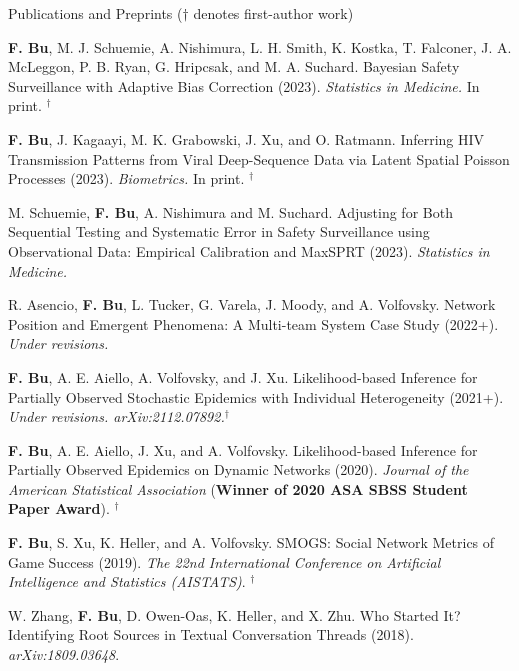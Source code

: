 \documentclass{resume} %
\begin{document}
\begin{rSection}{Publications and Preprints}
{\footnotesize{($\dagger$ denotes first-author work)}}

\textbf{F. Bu}, M. J. Schuemie,  A. Nishimura, L. H. Smith, K. Kostka, T. Falconer, J. A. McLeggon, P. B. Ryan, G. Hripcsak, and M. A. Suchard.
Bayesian Safety Surveillance with Adaptive Bias Correction (2023). \emph{Statistics in Medicine.}  In print.  $^\dagger$

\smallskip

\textbf{F. Bu}, J. Kagaayi, M. K. Grabowski, J. Xu, and O. Ratmann.
Inferring HIV Transmission Patterns from Viral Deep-Sequence Data via Latent Spatial Poisson Processes (2023). \emph{Biometrics.} In print. $^\dagger$

\smallskip

M. Schuemie, \textbf{F. Bu}, A. Nishimura and M. Suchard.
Adjusting for Both Sequential Testing and Systematic Error in Safety Surveillance using Observational Data: Empirical Calibration and MaxSPRT (2023). \emph{Statistics in Medicine.}

\smallskip

R. Asencio, \textbf{F. Bu}, L. Tucker, G. Varela, J. Moody, and A. Volfovsky. 
Network Position and Emergent Phenomena: A Multi-team System Case Study (2022+). \emph{Under revisions.}

\smallskip

\textbf{F. Bu}, A. E. Aiello, A. Volfovsky, and J. Xu.  
Likelihood-based Inference for Partially Observed Stochastic Epidemics with Individual Heterogeneity (2021+). \emph{Under revisions.  arXiv:2112.07892.}$^\dagger$

\smallskip


\textbf{F. Bu}, A. E. Aiello, J. Xu, and A. Volfovsky. 
Likelihood-based Inference for Partially Observed Epidemics on Dynamic Networks (2020). \emph{Journal of the American Statistical Association} (\textbf{Winner of 2020 ASA SBSS Student Paper Award}). $^\dagger$

\smallskip

\textbf{F. Bu}, S. Xu, K. Heller, and A. Volfovsky. 
SMOGS: Social Network Metrics of Game Success (2019). \emph{The 22nd International Conference on Artificial Intelligence and Statistics (AISTATS)}. $^\dagger$

\smallskip

W. Zhang, \textbf{F. Bu}, D. Owen-Oas, K. Heller, and X. Zhu. 
Who Started It? Identifying Root Sources in Textual Conversation Threads (2018). \emph{arXiv:1809.03648}.

\end{rSection}
\end{document}
